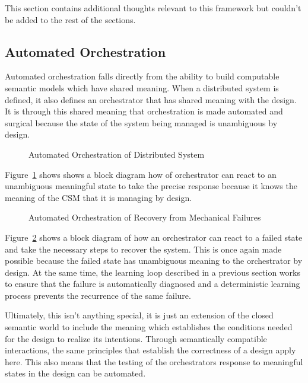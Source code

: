 This section contains additional thoughts relevant to this framework but couldn't be added to the rest of the sections. 

\subsection{Automated Orchestration}

Automated orchestration falls directly from the ability to build computable semantic models which have shared meaning. When a distributed system is defined, it also defines an orchestrator that has shared meaning with the design. It is through this shared meaning that orchestration is made automated and surgical because the state of the system being managed is unambiguous by design. 

\begin{figure}[htbp]
    \centering
    
    \caption{Automated Orchestration of Distributed System}
    \label{fig:automted_orchestration}
\end{figure}

Figure~\ref{fig:automted_orchestration} shows shows a block diagram how of orchestrator can react to an unambiguous meaningful state to take the precise response because it knows the meaning of the CSM that it is managing by design.

\begin{figure}[htbp]
    \centering
    
    \caption{Automated Orchestration of Recovery from Mechanical Failures}
    \label{fig:automated_recovery_orchestration}
\end{figure}

Figure~\ref{fig:automated_recovery_orchestration} shows a block diagram of how an orchestrator can react to a failed state and take the necessary steps to recover the system. This is once again made possible because the failed state has unambiguous meaning to the orchestrator by design. At the same time, the learning loop described in a previous section works to ensure that the failure is automatically diagnosed and a deterministic learning process prevents the recurrence of the same failure.

Ultimately, this isn't anything special, it is just an extension of the closed semantic world to include the meaning which establishes the conditions needed for the design to realize its intentions. Through semantically compatible interactions, the same principles that establish the correctness of a design apply here. This also means that the testing of the orchestrators response to meaningful states in the design can be automated.

